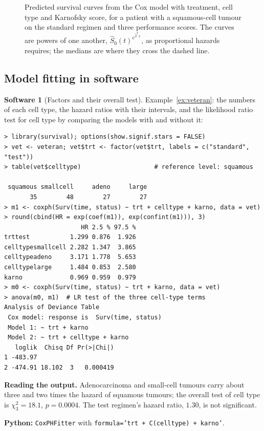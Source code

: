 \documentclass[11pt,a4paper]{article}
\numberwithin{equation}{section}
\theoremstyle{definition}
\newtheorem{software}[thm]{Software}
\begin{document}
\begin{figure}[H]
\caption{Predicted survival curves from the Cox model with treatment, cell type and Karnofsky score, for a patient with a squamous-cell tumour on the standard regimen and three performance scores. The curves are powers of one another, $\hat S_0(t)^{e^{\hat\beta^{\mathsf T}x}}$, as proportional hazards requires; the medians are where they cross the dashed line.}
\label{fig:adjusted}
\end{figure}

\subsection{Model fitting in software}
\label{ssec:software8}

\begin{software}[Factors and their overall test]
\label{sw:veteran}
Example~\ref{ex:veteran}: the numbers of each cell type, the hazard ratios with their intervals, and the likelihood ratio test for cell type by comparing the models with and without it:
{\small\begin{verbatim}
> library(survival); options(show.signif.stars = FALSE)
> vet <- veteran; vet$trt <- factor(vet$trt, labels = c("standard", "test"))
> table(vet$celltype)                    # reference level: squamous

 squamous smallcell     adeno     large 
       35        48        27        27 
> m1 <- coxph(Surv(time, status) ~ trt + celltype + karno, data = vet)
> round(cbind(HR = exp(coef(m1)), exp(confint(m1))), 3)
                     HR 2.5 % 97.5 %
trttest           1.299 0.876  1.926
celltypesmallcell 2.282 1.347  3.865
celltypeadeno     3.171 1.778  5.653
celltypelarge     1.484 0.853  2.580
karno             0.969 0.959  0.979
> m0 <- coxph(Surv(time, status) ~ trt + karno, data = vet)
> anova(m0, m1)  # LR test of the three cell-type terms
Analysis of Deviance Table
 Cox model: response is  Surv(time, status)
 Model 1: ~ trt + karno
 Model 2: ~ trt + celltype + karno
   loglik  Chisq Df Pr(>|Chi|)
1 -483.97                     
2 -474.91 18.102  3   0.000419
\end{verbatim}}
\textbf{Reading the output.} Adenocarcinoma and small-cell tumours carry about three and two times the hazard of squamous tumours; the overall test of cell type is $\chi^2_3 = 18.1$, $p = 0.0004$. The test regimen's hazard ratio, $1.30$, is not significant.

\textbf{Python:} \texttt{CoxPHFitter} with \texttt{formula='trt + C(celltype) + karno'}.
\end{software}
\end{document}
